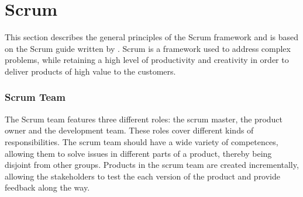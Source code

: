\section{Scrum}
\label{sect:scrum}
This section describes the general principles of the Scrum framework and is based on the Scrum guide written by \cite{cite:scrumGuide}.
Scrum is a framework used to address complex problems, while retaining a high level of productivity and creativity in order to deliver products of high value to the customers.

\subsubsection{Scrum Team}
The Scrum team features three different roles: the scrum master, the product owner and the development team. These roles cover different kinds of responsibilities. 
The scrum team should have a wide variety of competences, allowing them to solve issues in different parts of a product, thereby being disjoint from other groups.
Products in the scrum team are created incrementally, allowing the stakeholders to test the each version of the product and provide feedback along the way. 




